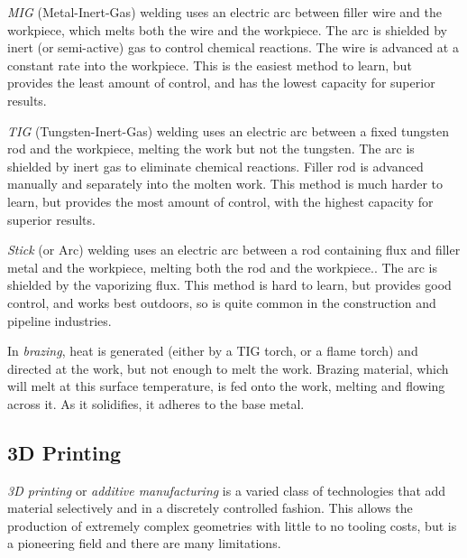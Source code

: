\documentclass[10pt,letterpaper]{book}
\begin{document}
 	\begin{asparaenum}[a)]
 		\item \textit{MIG} (Metal-Inert-Gas) welding uses an electric arc between filler wire and the workpiece, which melts both the wire and the workpiece. The arc is shielded by inert (or semi-active) gas to control chemical reactions. The wire is advanced at a constant rate into the workpiece. This is the easiest method to learn, but provides the least amount of control, and has the lowest capacity for superior results.
 		
 		\item \textit{TIG} (Tungsten-Inert-Gas) welding uses an electric arc between a fixed tungsten rod and the workpiece, melting the work but not the tungsten. The arc is shielded by inert gas to eliminate chemical reactions. Filler rod is advanced manually and separately into the molten work. This method is much harder to learn, but provides the most amount of control, with the highest capacity for superior results.
 		
 		\item \textit{Stick} (or Arc) welding uses an electric arc between a rod containing flux and filler metal and the workpiece, melting both the rod and the workpiece.. The arc is shielded by the vaporizing flux. This method is hard to learn, but provides good control, and works best outdoors, so is quite common in the construction and pipeline industries.
 		
 		\item In \textit{brazing}, heat is generated (either by a TIG torch, or a flame torch) and directed at the work, but not enough to melt the work. Brazing material, which will melt at this surface temperature, is fed onto the work, melting and flowing across it. As it solidifies, it adheres to the base metal.
 		
 	\end{asparaenum}
 	
 	\subsection{3D Printing}
 	
 	\textit{3D printing} or \textit{additive manufacturing} is a varied class of technologies that add material selectively and in a discretely controlled fashion. This allows the production of extremely complex geometries with little to no tooling costs, but is a pioneering field and there are many limitations.
 	
\end{document}
